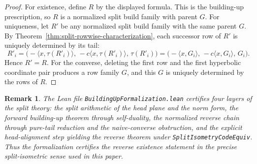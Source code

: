 \documentclass[12pt]{article}
\newtheorem{remark}[theorem]{Remark}
\begin{document}
\begin{proof}
For existence, define $R$ by the displayed formula. This is the building-up prescription, so $R$ is a normalized split build family with parent $G$. For uniqueness, let $R'$ be any normalized split build family with the same parent $G$. By Theorem~\ref{thm:split-rowwise-characterization}, each successor row of $R'$ is uniquely determined by its tail:
\[
R'_i
=
\bigl(-\langle x,\tau(R'_i)\rangle,\,-c\langle x,\tau(R'_i)\rangle,\,\tau(R'_i)\bigr)
=
\bigl(-\langle x,G_i\rangle,\,-c\langle x,G_i\rangle,\,G_i\bigr).
\]
Hence $R'=R$. For the converse, deleting the first row and the first hyperbolic coordinate pair produces a row family $G$, and this $G$ is uniquely determined by the rows of $R$.
\end{proof}

\begin{remark}{\rm
The Lean file \texttt{BuildingUpFormalization.lean} certifies four layers of the split theory: the split arithmetic of the head plane and the norm form, the forward building-up theorem through self-duality, the normalized reverse chain through pure-tail reduction and the naive-converse obstruction, and the explicit head-alignment step yielding the reverse theorem under \texttt{SplitIsometryCodeEquiv}. Thus the formalization certifies the reverse existence statement in the precise split-isometric sense used in this paper.
}
\end{remark}
\end{document}
